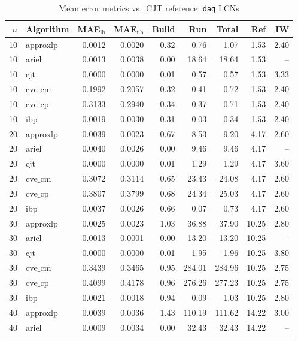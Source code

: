 \documentclass{article}
\begin{document}
\begin{table}[ht]
\centering
\caption{Mean error metrics vs.\ CJT reference: \texttt{dag} LCNs}
\begin{tabular}{rlrrrrrrr}
\toprule
 $n$ & Algorithm & MAE$_{\text{lb}}$ & MAE$_{\text{ub}}$ & Build & Run & Total & Ref & IW \\
\midrule
 10 & approxlp & 0.0012 & 0.0020 & 0.32 & 0.76 & 1.07 & 1.53 & 2.40 \\
 10 & ariel & 0.0013 & 0.0038 & 0.00 & 18.64 & 18.64 & 1.53 & -- \\
 10 & cjt & 0.0000 & 0.0000 & 0.01 & 0.57 & 0.57 & 1.53 & 3.33 \\
 10 & $\text{cve\_cm}$ & 0.1992 & 0.2057 & 0.32 & 0.41 & 0.72 & 1.53 & 2.40 \\
 10 & $\text{cve\_cp}$ & 0.3133 & 0.2940 & 0.34 & 0.37 & 0.71 & 1.53 & 2.40 \\
 10 & ibp & 0.0019 & 0.0030 & 0.31 & 0.03 & 0.34 & 1.53 & 2.40 \\
\hline
 20 & approxlp & 0.0039 & 0.0023 & 0.67 & 8.53 & 9.20 & 4.17 & 2.60 \\
 20 & ariel & 0.0040 & 0.0026 & 0.00 & 9.46 & 9.46 & 4.17 & -- \\
 20 & cjt & 0.0000 & 0.0000 & 0.01 & 1.29 & 1.29 & 4.17 & 3.60 \\
 20 & $\text{cve\_cm}$ & 0.3072 & 0.3114 & 0.65 & 23.43 & 24.08 & 4.17 & 2.60 \\
 20 & $\text{cve\_cp}$ & 0.3807 & 0.3799 & 0.68 & 24.34 & 25.03 & 4.17 & 2.60 \\
 20 & ibp & 0.0037 & 0.0026 & 0.66 & 0.07 & 0.73 & 4.17 & 2.60 \\
\hline
 30 & approxlp & 0.0025 & 0.0023 & 1.03 & 36.88 & 37.90 & 10.25 & 2.80 \\
 30 & ariel & 0.0013 & 0.0001 & 0.00 & 13.20 & 13.20 & 10.25 & -- \\
 30 & cjt & 0.0000 & 0.0000 & 0.01 & 1.95 & 1.96 & 10.25 & 3.80 \\
 30 & $\text{cve\_cm}$ & 0.3439 & 0.3465 & 0.95 & 284.01 & 284.96 & 10.25 & 2.75 \\
 30 & $\text{cve\_cp}$ & 0.4099 & 0.4178 & 0.96 & 276.26 & 277.23 & 10.25 & 2.75 \\
 30 & ibp & 0.0021 & 0.0018 & 0.94 & 0.09 & 1.03 & 10.25 & 2.80 \\
\hline
 40 & approxlp & 0.0039 & 0.0036 & 1.43 & 110.19 & 111.62 & 14.22 & 3.00 \\
 40 & ariel & 0.0009 & 0.0034 & 0.00 & 32.43 & 32.43 & 14.22 & -- \\

\end{tabular}
\end{table}
\end{document}
